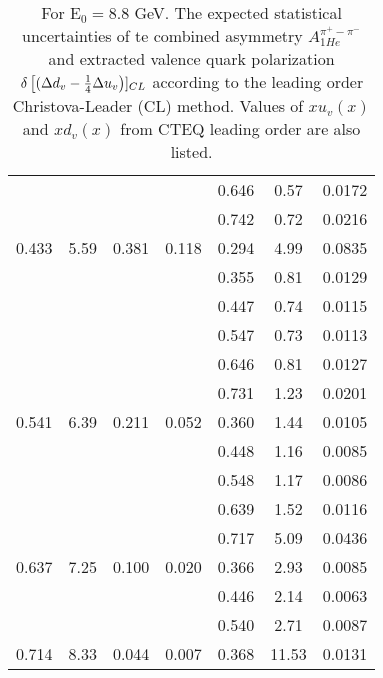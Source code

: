 \begin{table}[htbp]
\begin{center}
\begin{tabular}{|ccccc||c|c|}
         &          &          &          &    0.646 &      0.57 &    0.0172 \\
         &          &          &          &    0.742 &      0.72 &    0.0216 \\
   0.433 &    5.59 &   0.381 &    0.118 &    0.294 &      4.99 &    0.0835 \\
         &          &          &          &    0.355 &      0.81 &    0.0129 \\
         &          &          &          &    0.447 &      0.74 &    0.0115 \\
         &          &          &          &    0.547 &      0.73 &    0.0113 \\
         &          &          &          &    0.646 &      0.81 &    0.0127 \\
         &          &          &          &    0.731 &      1.23 &    0.0201 \\
   0.541 &    6.39 &   0.211 &    0.052 &    0.360 &      1.44 &    0.0105 \\
         &          &          &          &    0.448 &      1.16 &    0.0085 \\
         &          &          &          &    0.548 &      1.17 &    0.0086 \\
         &          &          &          &    0.639 &      1.52 &    0.0116 \\
         &          &          &          &    0.717 &      5.09 &    0.0436 \\
   0.637 &    7.25 &   0.100 &    0.020 &    0.366 &      2.93 &    0.0085 \\
         &          &          &          &    0.446 &      2.14 &    0.0063 \\
         &          &          &          &    0.540 &      2.71 &    0.0087 \\
   0.714 &    8.33 &   0.044 &    0.007 &    0.368 &     11.53 &    0.0131 \\
\hline
\end{tabular}
\end{center}
\caption{\label{tab:ddv2}  For E$_0=8.8 $ GeV. 
The expected statistical uncertainties of te combined asymmetry  $A_{1He}^{\pi^+ - \pi^-}$ and  extracted valence quark polarization $\delta \left[( \Delta d_v -{1 \over 4} \Delta u_v \right)]_{CL}$
according to the leading order Christova-Leader (CL) method. Values of $x u_v(x)$ and $x d_v(x)$ from CTEQ leading order are also listed.
}
\end{table}
